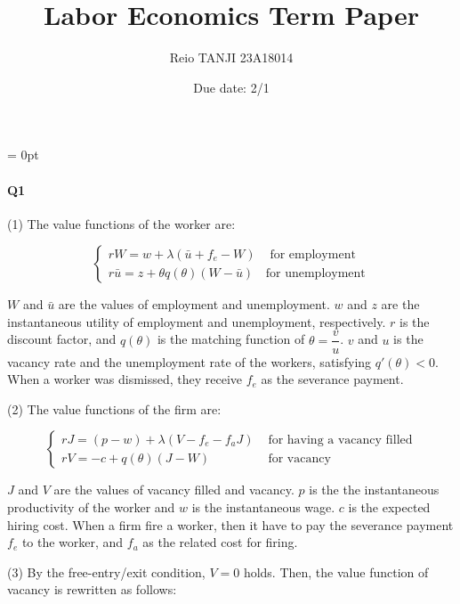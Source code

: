 \documentclass[dvipdfmx, 12pt]{article}
\begin{document}
\parindent = 0pt

\title{Labor Economics Term Paper}
\author{Reio TANJI 23A18014}
\date{Due date: 2/1}
\maketitle

\paragraph{Q1} \hspace{1zw}

(1) The value functions of the worker are:

\[
\begin{cases}
  rW = w + \lambda (\bar{u} + f_e - W) & \text{ for employment} \\
  r \bar{u} = z + \theta q(\theta) (W - \bar{u}) & \text{for unemployment}
\end{cases}
\]

$W$ and $\bar{u}$ are the values of employment and unemployment. $w$ and $z$ are the instantaneous utility of employment and unemployment, respectively. $r$ is the discount factor, and $q(\theta)$ is the matching function of $\theta = \dfrac{v}{u}$. $v$ and $u$ is the vacancy rate and the unemployment rate of the workers, satisfying $q'(\theta) < 0$. When a worker was dismissed, they receive $f_e$ as the severance payment.

\vspace{1zw}

(2) The value functions of the firm are:

\[
\begin{cases}
  rJ = (p - w) + \lambda (V - f_e - f_a J) & \text{ for having a vacancy filled} \\
  rV = -c + q(\theta) (J - W) & \text{ for vacancy}
\end{cases}
\]

$J$ and $V$ are the values of vacancy filled and vacancy. $p$ is the the instantaneous productivity of the worker and $w$ is the instantaneous wage. $c$ is the expected hiring cost. When a firm fire a worker, then it have to pay the severance payment $f_e$ to the worker, and $f_a$ as the related cost for firing.

\vspace{1zw}

(3) By the free-entry/exit condition, $V = 0$ holds. Then, the value function of vacancy is rewritten as follows:
\end{document}
